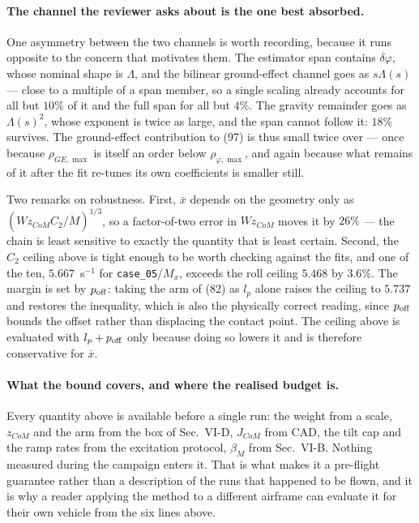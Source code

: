 \documentclass[10pt]{article}
\newcommand{\Wz}{W\!z_{CoM}}
\begin{document}
\paragraph{The channel the reviewer asks about is the one best absorbed.}
One asymmetry between the two channels is worth recording, because it
runs opposite to the concern that motivates them. The estimator span
contains $\delta\varphi$, whose nominal shape is $\Lambda$, and the
bilinear ground-effect channel goes as $s\Lambda(s)$ --- close to a
multiple of a span member, so a single scaling already accounts for all
but $10\%$ of it and the full span for all but $4\%$. The gravity
remainder goes as $\Lambda(s)^2$, whose exponent is twice as large, and
the span cannot follow it: $18\%$ survives. The ground-effect
contribution to (97) is thus small twice over --- once because
$\rho_{GE,\max}$ is itself an order below $\rho_{\varphi,\max}$, and
again because what remains of it after the fit re-tunes its own
coefficients is smaller still.

Two remarks on robustness. First, $\bar x$ depends on the geometry only
as $(\Wz C_2/\dot M)^{1/3}$, so a factor-of-two error in $\Wz$ moves it
by $26\%$ --- the chain is least sensitive to exactly the quantity that
is least certain. Second, the $C_2$ ceiling above is tight enough to be
worth checking against the fits, and one of the ten,
$5.667$~s$^{-1}$ for \texttt{case\_05}/$M_x$, exceeds the roll ceiling
$5.468$ by $3.6\%$. The margin is set by $p_{\rm off}$: taking the arm
of (82) as $l_p$ alone raises the ceiling to $5.737$ and restores the
inequality, which is also the physically correct reading, since
$p_{\rm off}$ bounds the offset rather than displacing the contact
point. The ceiling above is evaluated with $l_p + p_{\rm off}$ only
because doing so lowers it and is therefore conservative for $\bar x$.

\paragraph{What the bound covers, and where the realised budget is.}
Every quantity above is available before a single run: the weight from a
scale, $z_{CoM}$ and the arm from the box of Sec.~VI-D, $J_{CoM}$ from
CAD, the tilt cap and the ramp rates from the excitation protocol,
$\beta_M$ from Sec.~VI-B. Nothing measured during the campaign enters
it. That is what makes it a pre-flight guarantee rather than a
description of the runs that happened to be flown, and it is why a
reader applying the method to a different airframe can evaluate it for
their own vehicle from the six lines above.
\end{document}
